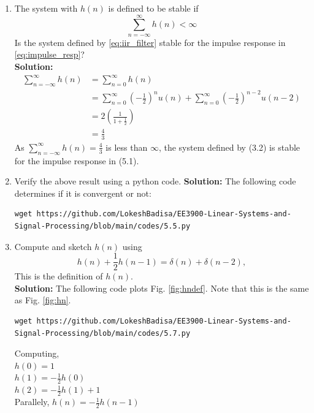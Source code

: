 \documentclass[journal,12pt,twocolumn]{IEEEtran}
\newcommand{\solution}{\noindent \textbf{Solution: }}
\providecommand{\brak}[1]{\ensuremath{\left(#1\right)}}
\numberwithin{equation}{section}
\renewcommand\thesection{\arabic{section}}
\begin{document}
\begin{enumerate}[label=\thesection.\arabic*]
\item The system with $h(n)$ is defined to be stable if
\begin{equation}
\sum_{n=-\infty}^{\infty}h(n) < \infty
\end{equation}
Is the system defined by \eqref{eq:iir_filter} stable for the impulse response in \eqref{eq:impulse_resp}?\\
\solution 
\begin{align}
\sum_{n=-\infty}^{\infty}h(n)&= \sum_{n=0}^{\infty}h(n)\\
&=\sum_{n=0}^{\infty}\brak{-\frac{1}{2}}^{n}u(n) + \sum_{n=0}^{\infty}\brak{-\frac{1}{2}}^{n-2}u(n-2)\\
&=2 \brak{ \frac{1}{1+\frac{1}{2}}}\\
&=\frac{4}{3}
\end{align}
As $\sum_{n=-\infty}^{\infty}h(n)=\frac{4}{3}$ is less than $\infty$, the system defined by (3.2) is stable for the impulse response in (5.1).
%
\item Verify the above result using a python code.
\solution The following code determines if it is convergent or not:
\begin{lstlisting}
wget https://github.com/LokeshBadisa/EE3900-Linear-Systems-and-Signal-Processing/blob/main/codes/5.5.py
\end{lstlisting}
%
\item 
Compute and sketch $h(n)$ using 
\begin{equation}
\label{eq:iir_filter_h}
h(n) + \frac{1}{2}h(n-1) = \delta(n) + \delta(n-2), 
\end{equation}
%
This is the definition of $h(n)$.
\\
\solution The following code plots Fig. \ref{fig:hndef}. Note that this is the same as Fig. 
\ref{fig:hn}. 
%
\begin{lstlisting}
wget https://github.com/LokeshBadisa/EE3900-Linear-Systems-and-Signal-Processing/blob/main/codes/5.7.py
\end{lstlisting}
Computing,\\
$h(0)=1$\\
$h(1)=-\frac{1}{2}h(0)$\\
$h(2)=-\frac{1}{2}h(1)+1$\\
Parallely, $h(n)=-\frac{1}{2}h(n-1)$


\end{enumerate}
\end{document}

